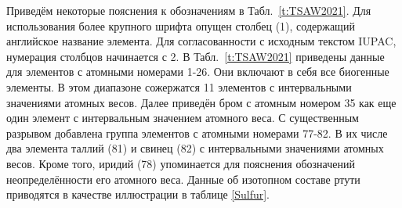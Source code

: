 \documentclass[a5paper,openany]{book}
\begin{document}
Приведём некоторые пояснения к обозначениям в Табл.~\ref{t:TSAW2021}. Для использования более крупного шрифта опущен столбец (1), содержащий английское название элемента. Для согласованности с исходным текстом IUPAC, нумерация столбцов начинается с 2. 
В Табл.~\ref{t:TSAW2021} приведены данные для элементов с атомными номерами 1-26. Они включают в себя все биогенные элементы. В этом диапазоне сожержатся 11 элементов с интервальными значениями атомных весов.
Далее приведён бром с атомным номером 35 как еще один элемент с интервальным значением атомного веса.
С существенным разрывом добавлена группа элементов  с атомными номерами 77-82. В их числе два элемента таллий (81) и свинец (82) с интервальными значениями атомных весов. Кроме того, иридий (78) упоминается для пояснения обозначений неопределённости его атомного веса. Данные об изотопном составе ртути приводятся в качестве иллюстрации в таблице \ref{Sulfur}. 


\end{document}
